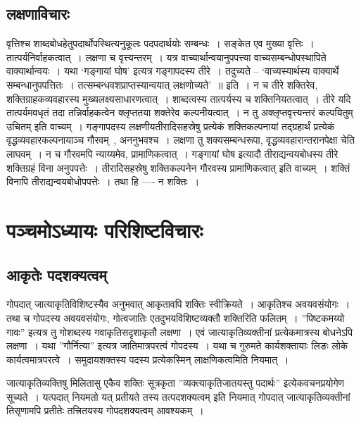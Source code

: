 	\section{लक्षणाविचारः} 

		वृत्तिश्च शाब्दबोधहेतुपदार्थोपस्थित्यनुकूलः पदपदार्थयोः सम्बन्धः~। सङ्केत एव मुख्या वृत्तिः~। तात्पर्यनिर्वाहकत्वात्~। लक्षणा च वृत्त्यन्तरम्~। यत्र वाच्यार्थान्वयानुपपत्त्या वाच्यसम्बन्धोपस्थापिते वाक्यार्थान्वयः~। यथा ‘गङ्गायां घोष’ इत्यत्र गङ्गापदस्य तीरे~। तदुच्यते – ‘वाच्यस्यार्थस्य वाक्यार्थे सम्बन्धानुपपत्तितः~। तत्सम्बन्धवशप्राप्तस्यान्वयात् लक्षणोच्यते’~॥ इति~। न च तीरे शक्तिरेव, शक्तिग्राहकव्यवहारस्य मुख्यलक्ष्यसाधारणत्वात्~। शाब्दत्वस्य तात्पर्यस्य च शक्तिनियतत्वात्~। तीरे यदि तात्पर्यमवधृतं तदा तन्निर्वाहकत्वेन क्लृप्ततया शक्तेरेव कल्पनीयत्वात्~। न तु अक्लृप्तवृत्त्यन्तरं कल्पयितुम् उचितम् इति वाच्यम्~। गङ्गापदस्य लक्षणीयतीरादिसहस्रेषु प्रत्येकं शक्तिकल्पनायां तद्ग्रहार्थं प्रत्येकं वृद्धव्यवहारकल्पनायाञ्च गौरवम्~, अननुभवश्च~। लक्षणा तु शक्यसम्बन्धरूपा, वृद्धव्यवहारान्तरानपेक्षा चेति लाघवम्~। न च गौरवमपि न्याय्यमेव, प्रामाणिकत्वात्~। गङ्गायां घोष इत्यादौ तीराद्यन्वयबोधस्य तीरे शक्तिग्रहं विना अनुपपत्तेः~। तीरादिसहस्रेषु शक्तिकल्पनेन गौरवस्य प्रामाणिकत्वात् इति वाच्यम्~। शक्तिं विनापि तीराद्यन्वयबोधोपपत्तेः~। तथा हि ---- न शक्तिः~। 

\chapter{पञ्चमोऽध्यायः परिशिष्टविचारः}

	\section{आकृतेः पदशक्यत्वम्} 
	
		गोपदात् जात्याकृतिविशिष्टस्यैव अनुभवात् आकृतावपि शक्तिः स्वीक्रियते~। आकृतिश्च अवयवसंयोगः~।  तथा च गोपदस्य अवयवसंयोगः, गोत्वजातिः एतदुभयविशिष्टव्यक्तौ शक्तिरिति फलितम्~।  ”पिष्टकमय्यो गावः” इत्यत्र तु गोशब्दस्य गवाकृतिसदृशाकृतौ लक्षणा~। एवं जात्याकृतिव्यक्तीनां प्रत्येकमात्रस्य बोधनेऽपि लक्षणा~।  यथा ”गौर्नित्या” इत्यत्र जातिमात्रपरत्वं गोपदस्य~।  यथा च गुरुमते कार्यशक्तायाः लिङः लोके  कार्यत्वमात्रपरत्वे~।  समुदायशक्तस्य पदस्य प्रत्येकस्मिन् लाक्षणिकत्वमिति नियमात्~। 

		जात्याकृतिव्यक्तिषु मिलितासु एकैव शक्तिः सूत्रकृता ”व्यक्त्याकृतिजातयस्तु पदार्थः” इत्येकवचनप्रयोगेण सूच्यते~।  यत्पदात् नियमतो यत् प्रतीयते तस्य तत्पदशक्यत्वम् इति नियमात् गोपदात् जात्याकृतिव्यक्तीनां तिसृणामपि प्रतीतेः तत्त्रितयस्य गोपदशक्यत्वम् आवश्यकम्~। 

